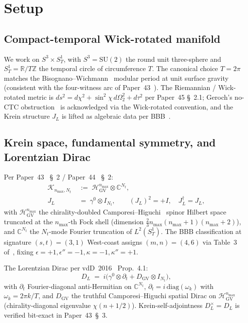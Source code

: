 \documentclass[11pt,a4paper]{article}
\theoremstyle{plain}
\theoremstyle{definition}
\newcommand{\nmax}{n_{\max}}
\newcommand{\Nt}{N_{t}}
\newcommand{\sthree}{S^{3}}
\newcommand{\SoneT}{S^{1}_{T}}
\newcommand{\Manifold}{S^{3}\times S^{1}_{T}}
\newcommand{\Krein}{\mathcal{K}}
\newcommand{\R}{\mathbb{R}}
\newcommand{\C}{\mathbb{C}}
\newcommand{\Z}{\mathbb{Z}}
\newcommand{\SU}{\mathrm{SU}}
\newcommand{\DGV}{D_{\mathrm{GV}}}
\newcommand{\DL}{D_{L}}
\newcommand{\JL}{J_{L}}
\newcommand{\HGV}{\mathcal{H}_{\mathrm{GV}}}
\begin{document}
\section{Setup}\label{sec:setup}

\subsection{Compact-temporal Wick-rotated manifold}\label{sec:manifold}

We work on $\Manifold$, with $\sthree = \SU(2)$ the round unit three-sphere
and $\SoneT = \R / T\Z$ the temporal circle of circumference $T$. The
canonical choice $T = 2\pi$ matches the
Bisognano--Wichmann~\cite{bisognano_wichmann1976} modular period at
unit surface gravity (consistent with the four-witness arc of
Paper~43~\cite{paper43}). The Riemannian / Wick-rotated metric is
$ds^{2} = d\chi^{2} + \sin^{2}\chi\,d\Omega_{2}^{2} + d\tau^{2}$ per
Paper~45 \S~2.1; Geroch's no-CTC obstruction~\cite{geroch1967} is
acknowledged via the Wick-rotated convention, and the Krein structure
$\JL$ is lifted as algebraic data per BBB~\cite{bizi_brouder_besnard2018}.

\subsection{Krein space, fundamental symmetry, and Lorentzian Dirac}
\label{sec:krein_DL}

Per Paper~43~\cite{paper43} \S~2 / Paper~44~\cite{paper44} \S~2:
\begin{align}
   \Krein_{\nmax, \Nt} &\;:=\; \HGV^{\nmax} \otimes \C^{\Nt},
   \label{eq:Krein_def} \\
   \JL &\;=\; \gamma^{0} \otimes I_{\Nt}, \qquad
   (\JL)^{2} = +I, \quad \JL^{\dagger} = \JL,
   \label{eq:J_def}
\end{align}
with $\HGV^{\nmax}$ the chirality-doubled
Camporesi--Higuchi~\cite{camporesi_higuchi1996} spinor Hilbert space
truncated at the $\nmax$-th Fock shell (dimension
$\tfrac{2}{3}\nmax(\nmax+1)(\nmax+2)$), and $\C^{\Nt}$ the
$\Nt$-mode Fourier truncation of $L^{2}(\SoneT)$. The BBB
classification at signature $(s, t) = (3, 1)$ West-coast assigns
$(m, n) = (4, 6)$ via Table~3 of~\cite{bizi_brouder_besnard2018}, fixing
$\epsilon = +1, \epsilon'' = -1, \kappa = -1, \kappa'' = +1$.

The Lorentzian Dirac per vdD~2016~\cite{vandungen2016} Prop.~4.1:
\begin{equation}\label{eq:DL_def}
   \DL \;=\; i\bigl(\gamma^{0} \otimes \partial_{t}
                    + \DGV \otimes I_{\Nt}\bigr),
\end{equation}
with $\partial_{t}$ Fourier-diagonal anti-Hermitian on $\C^{\Nt}$,
$\partial_{t} = i\,\mathrm{diag}(\omega_{k})$ with $\omega_{k} = 2\pi k/T$,
and $\DGV$ the truthful Camporesi--Higuchi spatial Dirac on
$\HGV^{\nmax}$ (chirality-diagonal eigenvalue $\chi(n + 1/2)$).
Krein-self-adjointness $\DL^{\times} = \DL$ is verified bit-exact in
Paper~43~\S~3.
\end{document}
